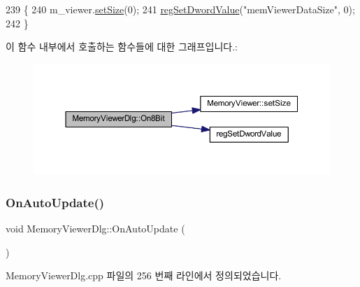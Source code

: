 \begin{DoxyCode}
239 \{
240   m\_viewer.\mbox{\hyperlink{class_memory_viewer_a185cb06e604ff1e0016b9be859c21387}{setSize}}(0);
241   \mbox{\hyperlink{_reg_8cpp_a758e775489a3fb5c3cc7071fdd5af87e}{regSetDwordValue}}(\textcolor{stringliteral}{"memViewerDataSize"}, 0);
242 \}
\end{DoxyCode}
이 함수 내부에서 호출하는 함수들에 대한 그래프입니다.\+:
\nopagebreak
\begin{figure}[H]
\begin{center}
\leavevmode
\includegraphics[width=350pt]{class_memory_viewer_dlg_ad408c6c194db416a0cf23480184ef610_cgraph}
\end{center}
\end{figure}
\mbox{\label{class_memory_viewer_dlg_abd1a90d5974c83a3b388043d6162f118}} 
\subsubsection{\texorpdfstring{On\+Auto\+Update()}{OnAutoUpdate()}}
{\footnotesize\ttfamily void Memory\+Viewer\+Dlg\+::\+On\+Auto\+Update (\begin{DoxyParamCaption}{ }\end{DoxyParamCaption})\hspace{0.3cm}{\ttfamily [protected]}}



Memory\+Viewer\+Dlg.\+cpp 파일의 256 번째 라인에서 정의되었습니다.


